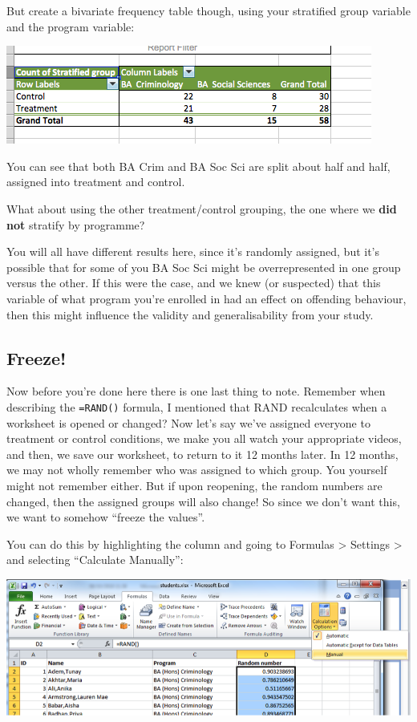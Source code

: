 \documentclass[]{book}
\theoremstyle{definition}
\theoremstyle{definition}
\theoremstyle{definition}
\theoremstyle{remark}
\begin{document}
But create a bivariate frequency table though, using your stratified
group variable and the program variable:

\includegraphics{imgs/biv_prog_tc.png}

You can see that both BA Crim and BA Soc Sci are split about half and
half, assigned into treatment and control.

What about using the other treatment/control grouping, the one where we
\textbf{did not} stratify by programme?

You will all have different results here, since it's randomly assigned,
but it's possible that for some of you BA Soc Sci might be
overrepresented in one group versus the other. If this were the case,
and we knew (or suspected) that this variable of what program you're
enrolled in had an effect on offending behaviour, then this might
influence the validity and generalisability from your study.

\hypertarget{freeze}{%
\subsection{Freeze!}\label{freeze}}

Now before you're done here there is one last thing to note. Remember
when describing the \texttt{=RAND()} formula, I mentioned that RAND
recalculates when a worksheet is opened or changed? Now let's say we've
assigned everyone to treatment or control conditions, we make you all
watch your appropriate videos, and then, we save our worksheet, to
return to it 12 months later. In 12 months, we may not wholly remember
who was assigned to which group. You yourself might not remember either.
But if upon reopening, the random numbers are changed, then the assigned
groups will also change! So since we don't want this, we want to somehow
``freeze the values''.

You can do this by highlighting the column and going to Formulas
\textgreater{} Settings \textgreater{} and selecting ``Calculate
Manually'':

\includegraphics{imgs/calc_man_pc.png}
\end{document}
